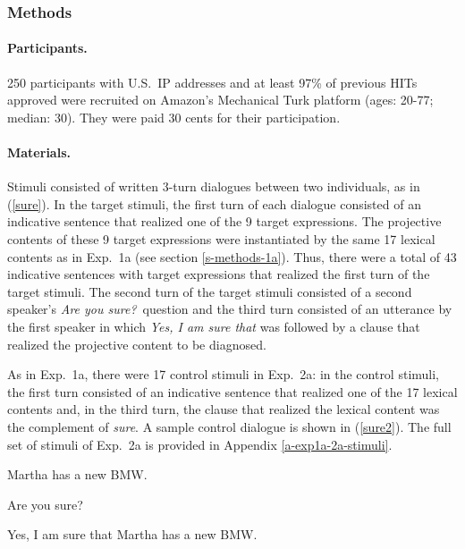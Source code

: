 \documentclass[11pt,fleqn]{article}
\newcommand{\6}{\mbox{$[\hspace*{-.6mm}[$}}
\newcommand{\9}{\mbox{$]\hspace*{-.6mm}]$}}
\begin{document}
\subsubsection{Methods}\label{s-methods-2a}

\paragraph{Participants.} 250 participants with U.S.\ IP addresses and at least 97\% of previous HITs approved were recruited on Amazon's Mechanical Turk platform (ages: 20-77; median: 30). They were paid 30 cents for their participation.


\paragraph{Materials.} Stimuli consisted of written 3-turn dialogues between two individuals, as in (\ref{sure}). In the target stimuli, the first turn of each dialogue consisted of an indicative sentence that realized one of the 9 target expressions. The projective contents of these 9 target expressions were instantiated by the same 17 lexical contents as in Exp.~1a (see section \ref{s-methods-1a}). Thus, there were a total of 43 indicative sentences with target expressions that realized the first turn of the target stimuli. The second turn of the target stimuli consisted of a second speaker's {\em Are you sure?}~question and the third turn consisted of an utterance by the first speaker in which {\em Yes, I am sure that} was followed by a clause that realized the projective content to be diagnosed.

As in Exp.~1a, there were 17 control stimuli in Exp.~2a: in the control stimuli, the first turn consisted of an indicative sentence that realized one of the 17 lexical contents and, in the third turn, the clause that realized the lexical content was the complement of {\em sure}. A sample control dialogue is shown in (\ref{sure2}). The full set of stimuli of Exp.~2a is provided in Appendix \ref{a-exp1a-2a-stimuli}.


\begin{exe}
\ex\label{sure2}
\begin{xlist}
 Martha has a new BMW.

 Are you sure?

 Yes, I am sure that Martha has a new BMW.
\end{xlist}
\end{exe}
\end{document}
